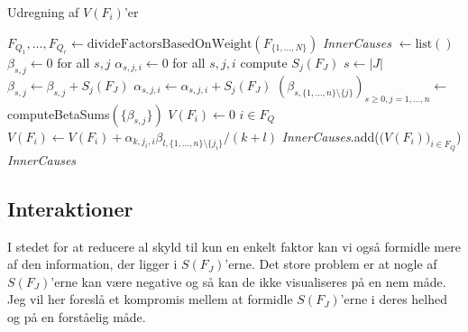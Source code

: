 \documentclass[a4paper, 12pt]{article}
\begin{document}
\begin{algorithm}
\caption{Udregning af $V(F_i)$'er}\label{inner_causes_Vs_multiplicity}
\begin{algorithmic}[1]
\State $F_{Q_1}, \dots, F_{Q_r} \gets \text{divideFactorsBasedOnWeight}(F_{\{1, \dots, N\}})$
\State \textit{InnerCauses} $ \gets \text{list}()$
 \State $\beta_{s,j} \gets 0$ for all $s,j$
 \State $\alpha_{s,j,i} \gets 0$ for all $s,j,i$
 \State compute $S_j(F_J)$
 \State $s\gets |J|$
 \State $\beta_{s,j} \gets \beta_{s,j}+S_j(F_J)$
 \State $\alpha_{s,j,i} \gets \alpha_{s,j,i} + S_j(F_J)$
 \EndFor
 \EndFor
 \EndFor
 \State $(\beta_{s,\{1, \dots, n\}\setminus \{j\}})_{s\geq 0, j=1, \dots, n} \gets $ computeBetaSums$(\{\beta_{s,j}\})$
 \State $V(F_i) \gets 0$  $i \in F_Q$
 \State $V(F_i)\gets V(F_i)+\alpha_{k,j_i,i}\beta_{l,\{1, \dots,n\}\setminus \{j_i\}}/(k+l)$
 \EndFor
 \EndFor
 \EndFor
 \State \textit{InnerCauses}.add($\bigl(V(F_i)\bigr)_{i\in F_Q}$)
  \EndFor
  \State \Return \textit{InnerCauses}
\EndProcedure
\end{algorithmic}
\end{algorithm}

\subsection{Interaktioner}

I stedet for at reducere al skyld til kun en enkelt faktor kan vi også formidle mere af den information, der ligger i $S(F_J)$'erne. Det store problem er at nogle af $S(F_J)$'erne kan være negative og så kan de ikke visualiseres på en nem måde. Jeg vil her foreslå et kompromis mellem at formidle $S(F_J)$'erne i deres helhed og på en forståelig måde. 
\end{document}
